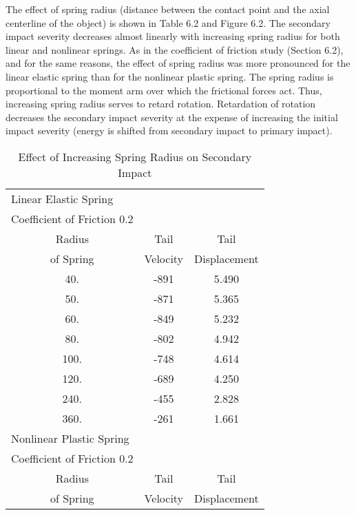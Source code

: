      The effect of spring radius (distance between the contact point
and the axial centerline of the object)
is shown in Table 6.2 and Figure 6.2.
The secondary impact severity decreases almost linearly with
increasing spring radius for both linear and nonlinear springs.  As in
the coefficient of friction study (Section 6.2),
and for the same reasons, the
effect of spring radius was more pronounced for the linear elastic
spring than for the nonlinear plastic spring. The spring radius is
proportional to the moment arm over which the frictional forces act.
Thus, increasing spring radius serves to retard rotation.  Retardation
of rotation decreases the secondary impact severity at the
expense of increasing the initial impact severity (energy is
shifted from secondary impact to primary impact).

\begin{table}
\begin{center}
\caption{Effect of Increasing Spring Radius on Secondary Impact}
\begin{tabular}{||c|c|c||}
\hline
\multicolumn{1}{||l|}{Linear Elastic Spring} & &\\
\multicolumn{1}{||l|}{Coefficient of Friction 0.2} & &\\
       Radius               &Tail                  &Tail\\
      of Spring           &Velocity            &Displacement\\
         40.                &-891                  &5.490\\
         50.                &-871                  &5.365\\
         60.                &-849                  &5.232\\
         80.                &-802                  &4.942\\
        100.                &-748                  &4.614\\
        120.                &-689                  &4.250\\
        240.                &-455                  &2.828\\
        360.                &-261                  &1.661\\
\hline
\multicolumn{1}{||l|}{Nonlinear Plastic Spring} & & \\
\multicolumn{1}{||l|}{Coefficient of Friction 0.2} & & \\
       Radius               &Tail                  &Tail\\
      of Spring           &Velocity            &Displacement\\

\end{tabular}
\end{center}
\end{table}
